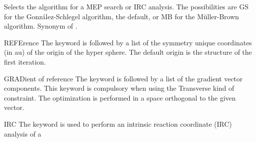\begin{keywordlist}
Selects the algorithm for a MEP search or IRC analysis.
The possibilities are GS for the Gonz\'alez-Schlegel algorithm, the default, or MB for the M\"uller-Brown algorithm.
Synonym of .
\item[REFErence]
The keyword is followed by a list of the symmetry unique coordinates (in au)
of the origin of the hyper sphere. The default origin is the structure
of the first iteration.
\item[GRADient of reference]
The keyword is followed by a list of the gradient vector components. This keyword is
compulsory when using the Transverse kind of constraint. The optimization is performed in
a space orthogonal to the given vector.
\item[IRC ]
The keyword is used to perform an intrinsic reaction coordinate (IRC) analysis of a

\end{keywordlist}
